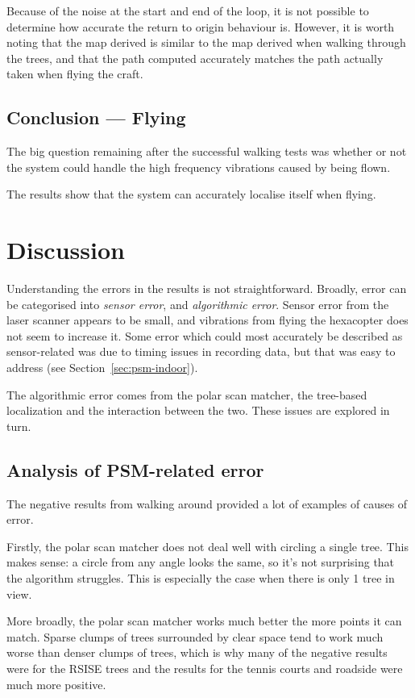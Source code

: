 \documentclass[12pt,oneside,a4paper]{book}
\begin{document}
Because of the noise at the start and end of the loop, it is not
possible to determine how accurate the return to origin behaviour
is. However, it is worth noting that the map derived is similar to the
map derived when walking through the trees, and that the path computed
accurately matches the path actually taken when flying the craft.
\newpage
\subsection{Conclusion --- Flying}
\label{sec:conclusion-flying}

The big question remaining after the successful walking tests was
whether or not the system could handle the high frequency vibrations
caused by being flown. 

The results show that the system can accurately localise itself when
flying. 

\section{Discussion}
\label{cha:discussion}

Understanding the errors in the results is not
straightforward. Broadly, error can be categorised into \emph{sensor
  error}, and \emph{algorithmic error}. Sensor error from the laser
scanner appears to be small, and vibrations from flying the hexacopter
does not seem to increase it. Some error which could most accurately
be described as sensor-related was due to timing issues in recording
data, but that was easy to address (see Section~\ref{sec:psm-indoor}).

The algorithmic error comes from the polar scan matcher, the
tree-based localization and the interaction between the two. These
issues are explored in turn.

\subsection{Analysis of PSM-related error}
\label{sec:psm-error}

The negative results from walking around provided a lot of examples of
causes of error.

Firstly, the polar scan matcher does not deal well with circling a
single tree. This makes sense: a circle from any angle looks the same,
so it's not surprising that the algorithm struggles. This is
especially the case when there is only 1 tree in view.

More broadly, the polar scan matcher works much better the more points
it can match. Sparse clumps of trees surrounded by clear space tend to
work much worse than denser clumps of trees, which is why many of the
negative results were for the RSISE trees and the results for the
tennis courts and roadside were much more positive.
\end{document}
